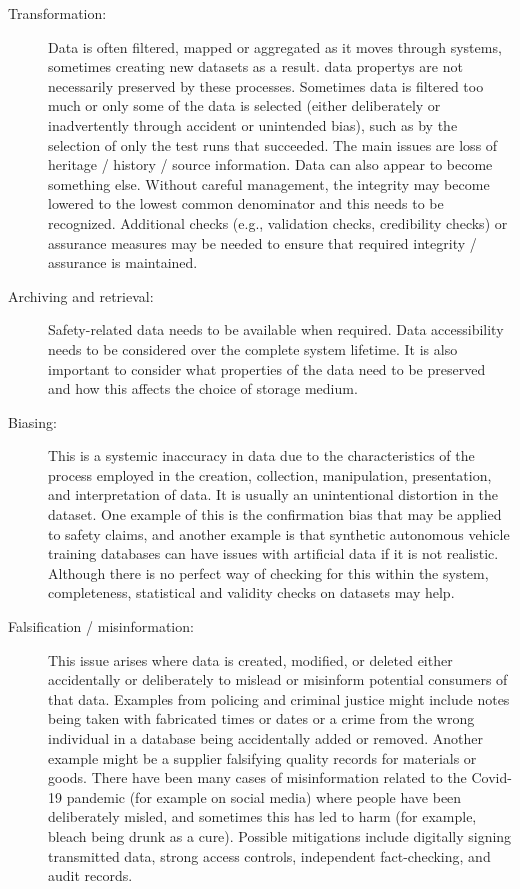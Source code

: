\begin{description}
	\item[Transformation:] Data is often filtered, mapped or aggregated as it moves through systems, sometimes creating new \glspl{dataset} as a result. \Glspl{data property} are not necessarily preserved by these processes. Sometimes data is filtered too much or only some of the data is selected (either deliberately or inadvertently through accident or unintended bias), such as by the selection of only the test runs that succeeded. The main issues are loss of heritage / history / source \gls{information}. Data can also appear to become something else. Without careful management, the \gls{integrity} may become lowered to the lowest common denominator and this needs to be recognized. Additional checks (e.g., \gls{validation} checks, credibility checks) or assurance measures may be needed to ensure that required \gls{integrity} / assurance is maintained.
	
	\item[Archiving and retrieval:] Safety-related data needs to be available when required. Data \gls{accessibility} needs to be considered over the complete system lifetime. It is also important to consider what properties of the data need to be preserved and how this affects the choice of storage medium.
	
	\item[Biasing:] This is a systemic inaccuracy in data due to the characteristics of the process employed in the creation, collection, manipulation, presentation, and interpretation of data. It is usually an unintentional distortion in the \gls{dataset}. One example of this is the confirmation bias that may be applied to safety claims, and another example is that synthetic autonomous vehicle training \glspl{database} can have issues with artificial data if it is not realistic.
	Although there is no perfect way of checking for this within the system, \gls{completeness}, statistical and validity checks on \glspl{dataset} may help.
	
	\item[Falsification / misinformation:] This issue arises where data is created, modified, or deleted either accidentally or deliberately to mislead or misinform potential consumers of that data. Examples from policing and criminal justice might include notes being taken with fabricated times or dates or a crime from the wrong individual in a \gls{database} being accidentally added or removed. Another example might be a supplier falsifying quality records for materials or goods. There have been many cases of misinformation related to the Covid-19 pandemic (for example on social media) where people have been deliberately misled, and sometimes this has led to harm (for example, bleach being drunk as a cure). Possible \glspl{mitigation} include digitally signing transmitted data, strong access controls, independent fact-checking, and audit records.
	

\end{description}
